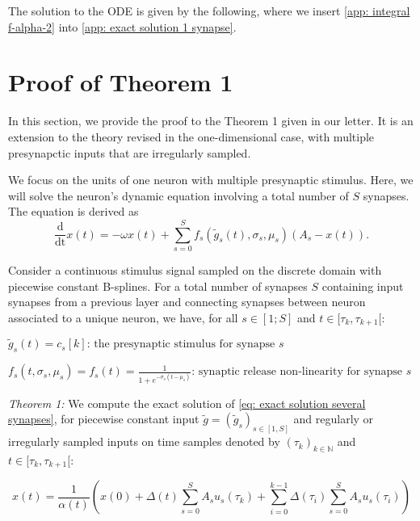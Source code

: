 \documentclass{article}
\begin{document}
The solution to the ODE is given by the following, where we insert \eqref{app: integral f-alpha-2} into \eqref{app: exact solution 1 synapse}.

\section{Proof of Theorem 1}
\setlength\parindent{0pt}

In this section, we provide the proof to the Theorem 1 given in our letter. It is an extension to the theory revised in the one-dimensional case, with multiple presynapctic inputs that are irregularly sampled. 

\noindent We focus on the units of one neuron with multiple presynaptic stimulus. Here, we will solve the neuron's dynamic equation involving a total number of $S$ synapses. The equation is derived as~\cite{Hasani_liquid_2021}~\cite{Wicks1996}
\begin{equation}
\frac{\mathrm{d}}{\mathrm{dt}}x(t)=-\omega x(t) + \sum_{s=0}^{S}f_s(\tilde{g}_s(t), \sigma_s, \mu_s)(A_s-x(t)).
\label{eq: exact solution several synapses}
\end{equation}

\noindent Consider a continuous stimulus signal sampled on the discrete domain with piecewise constant B-splines. For a total number of synapses $S$ containing input synapses from a previous layer and connecting synapses between neuron associated to a unique neuron, we have, for all \(s \in [1; S] \) and $t\in [\tau_k, \tau_{k+1}[$:

\medskip
\noindent $\tilde{g}_s(t) = c_s[k] \text{: the presynaptic stimulus for synapse $s$}$

\medskip
\noindent $f_s(t, \sigma_s, \mu_s) = f_s(t) = \frac{1}{1 + e^{-\sigma _s (t - \mu_s)}} \text{: synaptic release non-linearity for synapse $s$}$

\bigskip
\noindent \textit{Theorem 1:} We compute the exact solution of \eqref{eq: exact solution several synapses}, for piecewise constant input $\tilde{g} = (\tilde{g}_s)_{s\in [1, S]}$ and regularly or irregularly sampled inputs on time samples denoted by $(\tau_k)_{k\in \mathbb{N}} $  and $t\in [\tau_k, \tau_{k+1}[$:


\begin{equation} 
 x(t) =  \frac{1}{\alpha(t)} \left( x(0) + \Delta(t)\sum_{s=0}^{S} A_s u_s(\tau_k) +\sum_{i=0}^{k-1} \Delta(\tau_i)\sum_{s=0}^{S} A_s u_s(\tau_i) \right)
 \label{eq:exact solution}
\end{equation}
\end{document}
